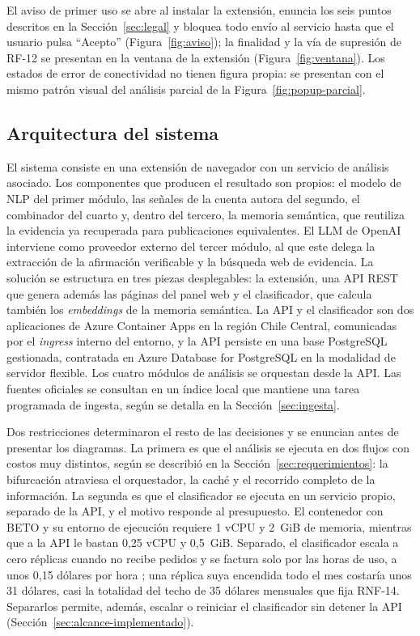 El aviso de primer uso se abre al instalar la extensión, enuncia los seis puntos descritos en la Sección~\ref{sec:legal} y bloquea todo envío al servicio hasta que el usuario pulsa \enquote{Acepto} (Figura~\ref{fig:aviso}); la finalidad y la vía de supresión de RF-12 se presentan en la ventana de la extensión (Figura~\ref{fig:ventana}). Los estados de error de conectividad no tienen figura propia: se presentan con el mismo patrón visual del análisis parcial de la Figura~\ref{fig:popup-parcial}.

\FloatBarrier
\subsection{Arquitectura del sistema}
\label{sec:arquitectura}

El sistema consiste en una extensión de navegador con un servicio de análisis asociado. Los componentes que producen el resultado son propios: el modelo de NLP del primer módulo, las señales de la cuenta autora del segundo, el combinador del cuarto y, dentro del tercero, la memoria semántica, que reutiliza la evidencia ya recuperada para publicaciones equivalentes. El LLM de OpenAI interviene como proveedor externo del tercer módulo, al que este delega la extracción de la afirmación verificable y la búsqueda web de evidencia. La solución se estructura en tres piezas desplegables: la extensión, una API REST que genera además las páginas del panel web y el clasificador, que calcula también los \textit{embeddings} de la memoria semántica. La API y el clasificador son dos aplicaciones de Azure Container Apps en la región Chile Central, comunicadas por el \textit{ingress} interno del entorno, y la API persiste en una base PostgreSQL gestionada, contratada en Azure Database for PostgreSQL en la modalidad de servidor flexible. Los cuatro módulos de análisis se orquestan desde la API. Las fuentes oficiales se consultan en un índice local que mantiene una tarea programada de ingesta, según se detalla en la Sección~\ref{sec:ingesta}.

Dos restricciones determinaron el resto de las decisiones y se enuncian antes de presentar los diagramas. La primera es que el análisis se ejecuta en dos flujos con costos muy distintos, según se describió en la Sección~\ref{sec:requerimientos}: la bifurcación atraviesa el orquestador, la caché y el recorrido completo de la información. La segunda es que el clasificador se ejecuta en un servicio propio, separado de la API, y el motivo responde al presupuesto. El contenedor con BETO y su entorno de ejecución requiere 1 vCPU y 2~GiB de memoria, mientras que a la API le bastan 0,25 vCPU y 0,5~GiB. Separado, el clasificador escala a cero réplicas cuando no recibe pedidos y se factura solo por las horas de uso, a unos 0,15 dólares por hora \parencite{MicrosoftAzureContainerApps2026}; una réplica suya encendida todo el mes costaría unos 31 dólares, casi la totalidad del techo de 35 dólares mensuales que fija RNF-14. Separarlos permite, además, escalar o reiniciar el clasificador sin detener la API (Sección~\ref{sec:alcance-implementado}).

